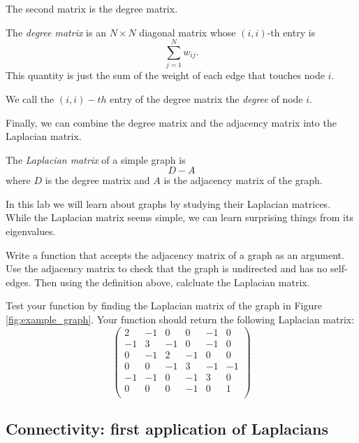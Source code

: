 The second matrix is the degree matrix. 
\begin{definition} The \emph{degree matrix} is an $N \times N$ diagonal matrix whose $(i,i)$-th entry is
\[ 
\sum_{j=1}^N w_{ij}.
\]
This quantity is just the sum of the weight of each edge that touches node $i$.
\end{definition}
We call the $(i, i)-th$ entry of the degree matrix the \emph{degree} of node $i$.

Finally, we can combine the degree matrix and the adjacency matrix into the Laplacian matrix.
\begin{definition}
The \emph{Laplacian matrix} of a simple graph is 
\[D - A \]
where $D$ is the degree matrix and $A$ is the adjacency matrix of the graph.
\end{definition}


In this lab we will learn about graphs by studying their Laplacian matrices.
While the Laplacian matrix seems simple, we can learn surprising things from its eigenvalues.


\begin{problem}
Write a function that accepts the adjacency matrix of a graph as an argument. Use the adjacency matrix to check that the graph is undirected and has no self-edges. Then using the definition above, calcluate the Laplacian matrix.

Test your function by finding the Laplacian matrix of the graph in Figure \ref{fig:example_graph}. Your function should return the following Laplacian matrix:
\[
\begin{pmatrix}
2 &-1 & 0 & 0 &-1 & 0 \\
-1 & 3 &-1 & 0 &-1 & 0 \\
0 &-1 & 2 &-1 & 0 & 0 \\
0 & 0 &-1 & 3 &-1 &-1 \\
-1 &-1 & 0 &-1 & 3 & 0 \\
0 & 0 & 0 &-1 & 0 & 1 \\
\end{pmatrix}
\]
\label{prob:laplacian}
\end{problem}



\subsection*{Connectivity: first application of Laplacians}

